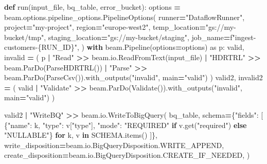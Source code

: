 \documentclass[
  11pt,
  british,
  oneside]{book}
\newenvironment{Shaded}{\begin{snugshade}}{\end{snugshade}}
\newcommand{\ControlFlowTok}[1]{\textcolor[rgb]{0.13,0.29,0.53}{\textbf{#1}}}
\newcommand{\ImportTok}[1]{#1}
\newcommand{\KeywordTok}[1]{\textcolor[rgb]{0.13,0.29,0.53}{\textbf{#1}}}
\newcommand{\NormalTok}[1]{#1}
\newcommand{\OperatorTok}[1]{\textcolor[rgb]{0.81,0.36,0.00}{\textbf{#1}}}
\newcommand{\SpecialCharTok}[1]{\textcolor[rgb]{0.00,0.00,0.00}{#1}}
\newcommand{\SpecialStringTok}[1]{\textcolor[rgb]{0.31,0.60,0.02}{#1}}
\newcommand{\StringTok}[1]{\textcolor[rgb]{0.31,0.60,0.02}{#1}}
\begin{document}
\begin{Shaded}
\begin{Highlighting}[]
\KeywordTok{def}\NormalTok{ run(input\_file, bq\_table, error\_bucket):}
\NormalTok{    options }\OperatorTok{=}\NormalTok{ beam.options.pipeline\_options.PipelineOptions(}
\NormalTok{        runner}\OperatorTok{=}\StringTok{"DataflowRunner"}\NormalTok{,}
\NormalTok{        project}\OperatorTok{=}\StringTok{"my{-}project"}\NormalTok{,}
\NormalTok{        region}\OperatorTok{=}\StringTok{"europe{-}west2"}\NormalTok{,}
\NormalTok{        temp\_location}\OperatorTok{=}\StringTok{"gs://my{-}bucket/tmp"}\NormalTok{,}
\NormalTok{        staging\_location}\OperatorTok{=}\StringTok{"gs://my{-}bucket/staging"}\NormalTok{,}
\NormalTok{        job\_name}\OperatorTok{=}\SpecialStringTok{f"ingest{-}customers{-}}\SpecialCharTok{\{}\NormalTok{RUN\_ID}\SpecialCharTok{\}}\SpecialStringTok{"}\NormalTok{,}
\NormalTok{    )}
    \ControlFlowTok{with}\NormalTok{ beam.Pipeline(options}\OperatorTok{=}\NormalTok{options) }\ImportTok{as}\NormalTok{ p:}
\NormalTok{        valid, invalid }\OperatorTok{=}\NormalTok{ (}
\NormalTok{            p}
            \OperatorTok{|} \StringTok{"Read"}      \OperatorTok{\textgreater{}\textgreater{}}\NormalTok{ beam.io.ReadFromText(input\_file)}
            \OperatorTok{|} \StringTok{"HDRTRL"}    \OperatorTok{\textgreater{}\textgreater{}}\NormalTok{ beam.ParDo(ParseHDRTRL())}
            \OperatorTok{|} \StringTok{"Parse"}     \OperatorTok{\textgreater{}\textgreater{}}\NormalTok{ beam.ParDo(ParseCsv()).with\_outputs(}\StringTok{"invalid"}\NormalTok{, main}\OperatorTok{=}\StringTok{"valid"}\NormalTok{)}
\NormalTok{        )}
\NormalTok{        valid2, invalid2 }\OperatorTok{=}\NormalTok{ (}
\NormalTok{            valid}
            \OperatorTok{|} \StringTok{"Validate"}  \OperatorTok{\textgreater{}\textgreater{}}\NormalTok{ beam.ParDo(Validate()).with\_outputs(}\StringTok{"invalid"}\NormalTok{, main}\OperatorTok{=}\StringTok{"valid"}\NormalTok{)}
\NormalTok{        )}

\NormalTok{        valid2 }\OperatorTok{|} \StringTok{"WriteBQ"} \OperatorTok{\textgreater{}\textgreater{}}\NormalTok{ beam.io.WriteToBigQuery(}
\NormalTok{            bq\_table,}
\NormalTok{            schema}\OperatorTok{=}\NormalTok{\{}\StringTok{"fields"}\NormalTok{: [}
\NormalTok{                \{}\StringTok{"name"}\NormalTok{: k, }\StringTok{"type"}\NormalTok{: v[}\StringTok{"type"}\NormalTok{], }\StringTok{"mode"}\NormalTok{: }\StringTok{"REQUIRED"} \ControlFlowTok{if}\NormalTok{ v.get(}\StringTok{"required"}\NormalTok{) }\ControlFlowTok{else} \StringTok{"NULLABLE"}\NormalTok{\}}
                \ControlFlowTok{for}\NormalTok{ k, v }\KeywordTok{in}\NormalTok{ SCHEMA.items()}
\NormalTok{            ]\},}
\NormalTok{            write\_disposition}\OperatorTok{=}\NormalTok{beam.io.BigQueryDisposition.WRITE\_APPEND,}
\NormalTok{            create\_disposition}\OperatorTok{=}\NormalTok{beam.io.BigQueryDisposition.CREATE\_IF\_NEEDED,}
\NormalTok{        )}


\end{Highlighting}
\end{Shaded}
\end{document}

